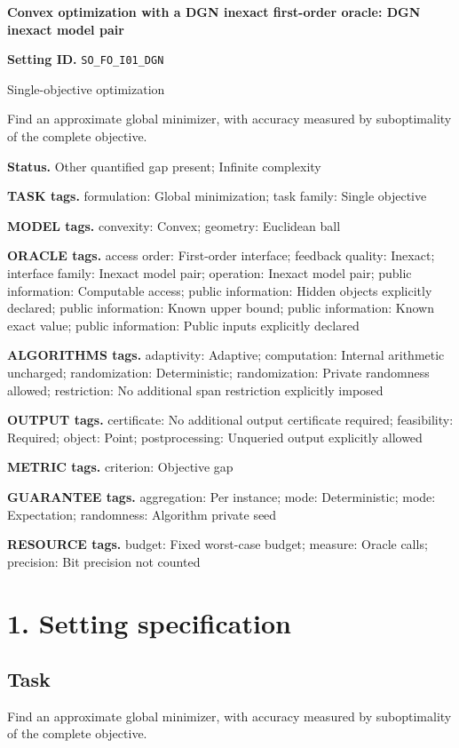 \documentclass[10pt,a4paper]{article}
\begin{document}
\raggedright

{\LARGE\bfseries\sffamily\color{AtlasNavy} Convex optimization with a DGN inexact first-order oracle: DGN inexact model pair\par}\vspace{5pt}
\textbf{Setting ID.} \texttt{SO\_\allowbreak{}FO\_\allowbreak{}I01\_\allowbreak{}DGN}

Single-objective optimization

Find an approximate global minimizer, with accuracy measured by suboptimality of the complete objective.

\textbf{Status.} Other quantified gap present; Infinite complexity

\textbf{TASK tags.} formulation: Global minimization; task family: Single objective

\textbf{MODEL tags.} convexity: Convex; geometry: Euclidean ball

\textbf{ORACLE tags.} access order: First-order interface; feedback quality: Inexact; interface family: Inexact model pair; operation: Inexact model pair; public information: Computable access; public information: Hidden objects explicitly declared; public information: Known upper bound; public information: Known exact value; public information: Public inputs explicitly declared

\textbf{ALGORITHMS tags.} adaptivity: Adaptive; computation: Internal arithmetic uncharged; randomization: Deterministic; randomization: Private randomness allowed; restriction: No additional span restriction explicitly imposed

\textbf{OUTPUT tags.} certificate: No additional output certificate required; feasibility: Required; object: Point; postprocessing: Unqueried output explicitly allowed

\textbf{METRIC tags.} criterion: Objective gap

\textbf{GUARANTEE tags.} aggregation: Per instance; mode: Deterministic; mode: Expectation; randomness: Algorithm private seed

\textbf{RESOURCE tags.} budget: Fixed worst-case budget; measure: Oracle calls; precision: Bit precision not counted

\section{1. Setting specification}
\subsection{Task}
Find an approximate global minimizer, with accuracy measured by suboptimality of the complete objective.
\end{document}

